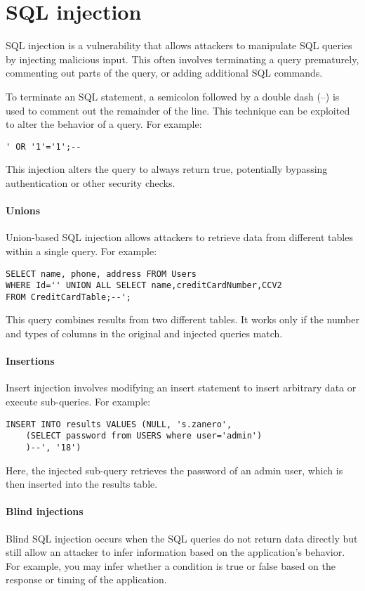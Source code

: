 \section{SQL injection}

SQL injection is a vulnerability that allows attackers to manipulate SQL queries by injecting malicious input.
This often involves terminating a query prematurely, commenting out parts of the query, or adding additional SQL commands.

To terminate an SQL statement, a semicolon followed by a double dash (--) is used to comment out the remainder of the line. 
This technique can be exploited to alter the behavior of a query. For example:
\begin{verbatim}
' OR '1'='1';--
\end{verbatim}
This injection alters the query to always return true, potentially bypassing authentication or other security checks.

\paragraph*{Unions}
Union-based SQL injection allows attackers to retrieve data from different tables within a single query. 
For example:
\begin{verbatim}
SELECT name, phone, address FROM Users
WHERE Id='' UNION ALL SELECT name,creditCardNumber,CCV2 
FROM CreditCardTable;--';
\end{verbatim}
This query combines results from two different tables. 
It works only if the number and types of columns in the original and injected queries match.

\paragraph*{Insertions}
Insert injection involves modifying an insert statement to insert arbitrary data or execute sub-queries. For example:
\begin{verbatim}
INSERT INTO results VALUES (NULL, 's.zanero',
    (SELECT password from USERS where user='admin')
    )--', '18')
\end{verbatim}
Here, the injected sub-query retrieves the password of an admin user, which is then inserted into the results table.

\paragraph*{Blind injections}
Blind SQL injection occurs when the SQL queries do not return data directly but still allow an attacker to infer information based on the application's behavior. 
For example, you may infer whether a condition is true or false based on the response or timing of the application.

